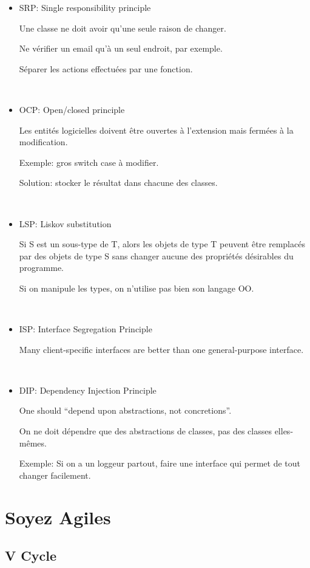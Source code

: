 \documentclass[a4paper,11pt]{article}
\begin{document}
\begin{itemize}
\item SRP: Single responsibility principle

  Une classe ne doit avoir qu'une seule raison de changer.

  Ne vérifier un email qu'à un seul endroit, par exemple.

  Séparer les actions effectuées par une fonction.

  \
\item OCP: Open/closed principle

  Les entités logicielles doivent être ouvertes à l'extension mais fermées à la
  modification.

  Exemple: gros switch case à modifier.

  Solution: stocker le résultat dans chacune des classes.

  \

\item LSP: Liskov substitution

  Si S est un sous-type de T, alors les objets de type T peuvent être remplacés
  par des objets de type S sans changer aucune des propriétés désirables du
  programme.

  Si on manipule les types, on n'utilise pas bien son langage OO.

  \

\item ISP: Interface Segregation Principle

  Many client-specific interfaces are better than one general-purpose interface.

  \

\item DIP: Dependency Injection Principle

  One should ``depend upon abstractions, not concretions''.

  On ne doit dépendre que des abstractions de classes, pas des classes
  elles-mêmes.

  Exemple: Si on a un loggeur partout, faire une interface qui permet de tout
  changer facilement.

\end{itemize}

\section{Soyez Agiles}

\subsection{V Cycle}
\end{document}

